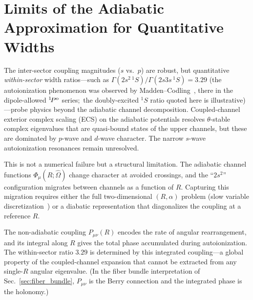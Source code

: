 \documentclass[aps,pra,twocolumn,superscriptaddress,longbibliography]{revtex4-2}
\begin{document}

\section{Limits of the Adiabatic Approximation for Quantitative Widths}
\label{sec:adiabatic_limits}

The inter-sector coupling magnitudes ($s$ vs.\ $p$) are robust, but
quantitative \emph{within-sector} width ratios---such as
$\Gamma(2s^2\,{}^1\!S)/\Gamma(2s3s\,{}^1\!S) = 3.29$
(the autoionization phenomenon was observed by Madden--Codling~\cite{Madden1963}, there in the dipole-allowed ${}^1\!P^{\rm o}$ series;\ the doubly-excited ${}^1\!S$ ratio quoted here is illustrative)---probe physics beyond the adiabatic
channel decomposition.  Coupled-channel exterior complex scaling (ECS)
on the adiabatic potentials resolves $\theta$-stable complex
eigenvalues that are quasi-bound states of the upper channels, but
these are dominated by $p$-wave and $d$-wave character.  The narrow
$s$-wave autoionization resonances remain unresolved.

This is not a numerical failure but a structural limitation.  The
adiabatic channel functions $\Phi_\mu(R; \hat\Omega)$ change
character at avoided crossings, and the ``$2s^2$'' configuration
migrates between channels as a function of $R$.  Capturing this
migration requires either the full two-dimensional $(R, \alpha)$
problem (slow variable discretization~\cite{Tolstikhin1996}) or a
diabatic representation that diagonalizes the coupling at a
reference $R$.

The non-adiabatic coupling $P_{\mu\nu}(R)$ encodes the rate of
angular rearrangement, and its integral along $R$ gives the total
phase accumulated during autoionization.  The within-sector ratio
$3.29$ is determined by this integrated coupling---a global property
of the coupled-channel expansion that cannot be extracted from any
single-$R$ angular eigenvalue.  (In the fiber bundle interpretation
of Sec.~\ref{sec:fiber_bundle}, $P_{\mu\nu}$ is the Berry connection
and the integrated phase is the holonomy.)

\end{document}
